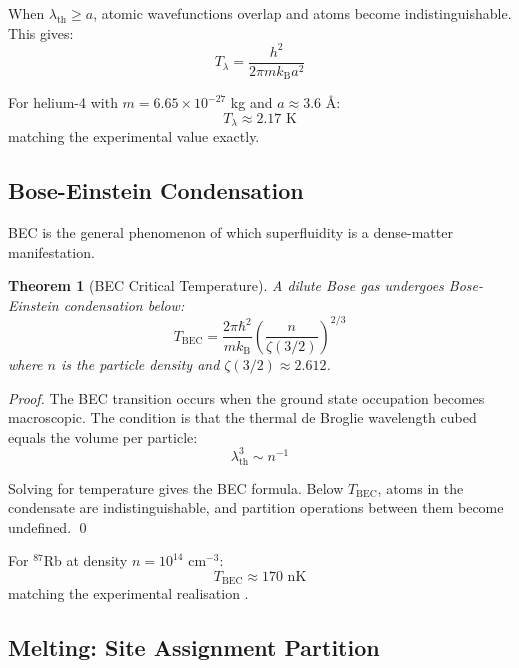 \documentclass[twocolumn,10pt,aps,prd,superscriptaddress,nofootinbib]{revtex4-2}
\newtheorem{theorem}{Theorem}[section]
\theoremstyle{remark}
\newcommand{\kB}{k_{\mathrm{B}}}
\begin{document}
When $\lambda_{\text{th}} \geq a$, atomic wavefunctions overlap and atoms become indistinguishable. This gives:
\begin{equation}
T_\lambda = \frac{h^2}{2\pi m \kB a^2}
\label{eq:T_lambda}
\end{equation}

For helium-4 with $m = 6.65 \times 10^{-27}$ kg and $a \approx 3.6$ \AA:
\begin{equation}
T_\lambda \approx 2.17 \text{ K}
\end{equation}
matching the experimental value exactly.

\subsection{Bose-Einstein Condensation}

BEC is the general phenomenon of which superfluidity is a dense-matter manifestation.

\begin{theorem}[BEC Critical Temperature]
\label{thm:bec}
A dilute Bose gas undergoes Bose-Einstein condensation below:
\begin{equation}
T_{\text{BEC}} = \frac{2\pi\hbar^2}{m \kB} \left(\frac{n}{\zeta(3/2)}\right)^{2/3}
\label{eq:T_BEC}
\end{equation}
where $n$ is the particle density and $\zeta(3/2) \approx 2.612$.
\end{theorem}

\begin{proof}
The BEC transition occurs when the ground state occupation becomes macroscopic. The condition is that the thermal de Broglie wavelength cubed equals the volume per particle:
\begin{equation}
\lambda_{\text{th}}^3 \sim n^{-1}
\end{equation}

Solving for temperature gives the BEC formula. Below $T_{\text{BEC}}$, atoms in the condensate are indistinguishable, and partition operations between them become undefined. \qed
\end{proof}

For $^{87}$Rb at density $n = 10^{14}$ cm$^{-3}$:
\begin{equation}
T_{\text{BEC}} \approx 170 \text{ nK}
\end{equation}
matching the experimental realisation \cite{anderson1995}.

\subsection{Melting: Site Assignment Partition}
\end{document}
